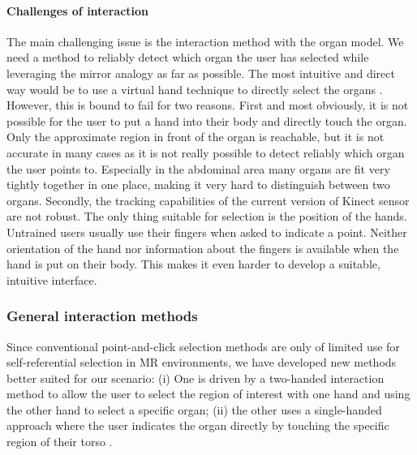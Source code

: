 \paragraph{Challenges of interaction}
The main challenging issue is the interaction method with the organ model. We need a method to reliably detect which organ the user has selected while leveraging the mirror analogy as far as possible. The most intuitive and direct way would be to use a virtual hand technique to directly select the organs \cite{Ha2010a}. However, this is bound to fail for two reasons.
First and most obviously, it is not possible for the user to put a hand into their body and directly touch the organ. Only the approximate region in front of the organ is reachable, but it is not accurate in many cases as it is not really possible to detect reliably which organ the user points to. 
Especially in the abdominal area many organs are fit very tightly together in one place, making it very hard to distinguish between two organs.
Secondly, the tracking capabilities of the current version of Kinect sensor are not robust. The only thing suitable for selection is the position of the hands. 
Untrained users usually use their fingers when asked to indicate a point.
Neither orientation of the hand nor information about the fingers is available when the hand is put on their body. 
This makes it even harder to develop a suitable, intuitive interface. 

\subsubsection{General interaction methods}
Since conventional point-and-click selection methods are only of limited use for self-referential selection in MR environments, we have developed new methods better suited for our scenario: (i) One is driven by a two-handed interaction method to allow the user to select the region of interest with one hand and using the other hand to select a specific organ; (ii) the other uses a single-handed approach where the user indicates the organ directly by touching the specific region of their torso \cite{weiss2013}. 

